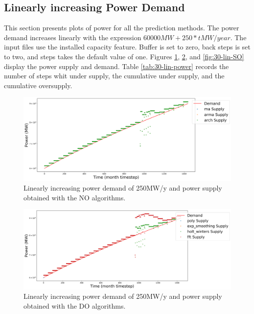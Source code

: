 \documentclass[11pt]{article}
\begin{document}
\subsection{Linearly increasing Power Demand}

This section presents plots of power for all the prediction methods. The power demand increases linearly with the expression $60000 MW + 250*t MW/year$. The input files use the installed capacity feature. Buffer is set to zero, back steps is set to two, and steps takes the default value of one.
Figures \ref{fig:30-lin-NO}, \ref{fig:30-lin-DO}, and \ref{fig:30-lin-SO} display the power supply and demand.
Table \ref{tab:30-lin-power} records the number of steps whit under supply, the cumulative under supply, and the cumulative oversupply.

\begin{figure}[H]
	\centering
	\includegraphics[width=\textwidth]{30-figures/lin-30-power-buffer01.png} 
	\hfill
	\caption{Linearly increasing power demand of 250MW/y and power supply obtained with the NO algorithms.}
	\label{fig:30-lin-NO}
\end{figure}

\begin{figure}[H]
	\centering
	\includegraphics[width=\textwidth]{30-figures/lin-30-power-buffer02.png} 
	\hfill
	\caption{Linearly increasing power demand of 250MW/y and power supply obtained with the DO algorithms.}
	\label{fig:30-lin-DO}
\end{figure}
\end{document}
